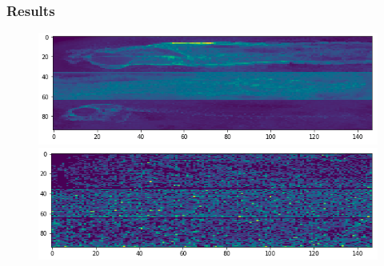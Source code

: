 \documentclass[9pt]{beamer}
\begin{document}
\begin{frame}
\frametitle{Results}
\begin{figure}
\centering
\begin{minipage}{.5\textwidth}
  \centering
  \includegraphics[scale=0.3]{Images/fish_superposition}
\end{minipage}%
\begin{minipage}{.5\textwidth}
  \centering
  \includegraphics[scale=0.3]{Images/9648_fishes_separation}
\end{minipage}
\end{figure}


\end{frame}
\end{document}
